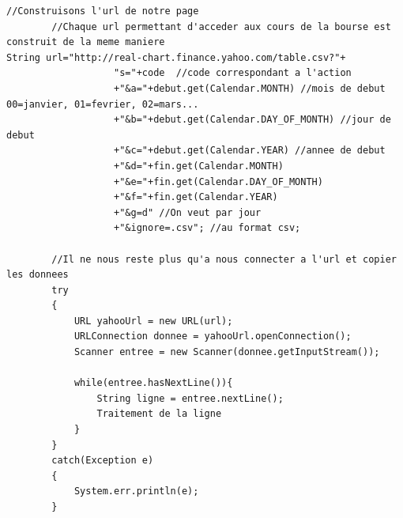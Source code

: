 \begin{lstlisting}
//Construisons l'url de notre page
		//Chaque url permettant d'acceder aux cours de la bourse est construit de la meme maniere
String url="http://real-chart.finance.yahoo.com/table.csv?"+
		           "s="+code  //code correspondant a l'action
		           +"&a="+debut.get(Calendar.MONTH) //mois de debut 00=janvier, 01=fevrier, 02=mars...
		           +"&b="+debut.get(Calendar.DAY_OF_MONTH) //jour de debut
		           +"&c="+debut.get(Calendar.YEAR) //annee de debut
		           +"&d="+fin.get(Calendar.MONTH)
		           +"&e="+fin.get(Calendar.DAY_OF_MONTH)
		           +"&f="+fin.get(Calendar.YEAR)
		           +"&g=d" //On veut par jour
		           +"&ignore=.csv"; //au format csv;
		
		//Il ne nous reste plus qu'a nous connecter a l'url et copier les donnees
		try
		{
			URL yahooUrl = new URL(url);
			URLConnection donnee = yahooUrl.openConnection();
			Scanner entree = new Scanner(donnee.getInputStream());
			
			while(entree.hasNextLine()){
				String ligne = entree.nextLine();
				Traitement de la ligne
			}	
		}
		catch(Exception e)
		{
			System.err.println(e);
		}
\end{lstlisting} 
